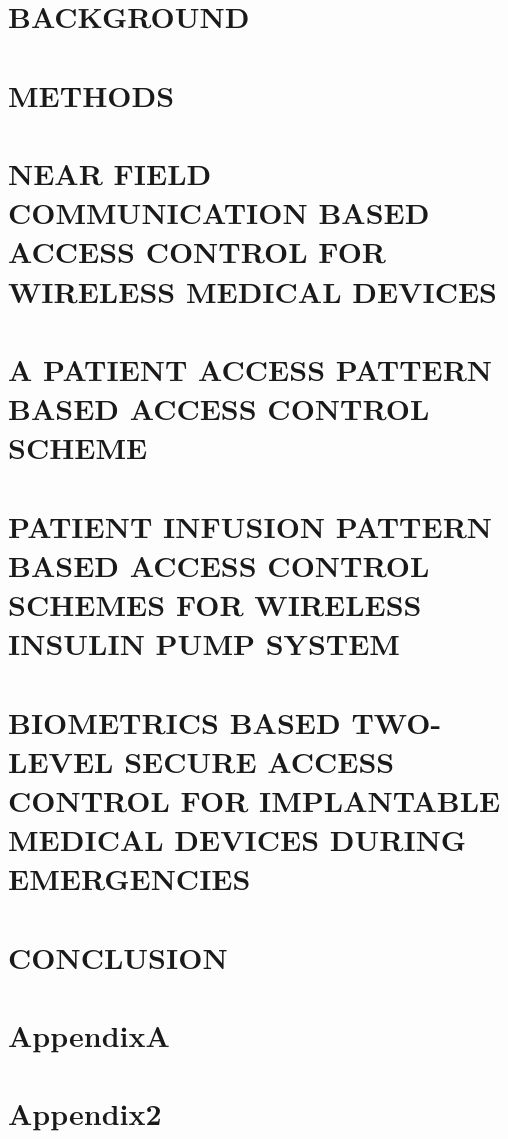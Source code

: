 \documentclass[reqno,12pt,oneside]{report} %
\begin{document}
\chapter{BACKGROUND}
 \label{chap:2}

\chapter{METHODS}
 \label{chap:3}
 

\chapter{NEAR FIELD COMMUNICATION BASED ACCESS CONTROL FOR WIRELESS MEDICAL DEVICES}
 \label{chap:4}

\chapter{A PATIENT ACCESS PATTERN BASED ACCESS CONTROL SCHEME}
 \label{chap:5}

\chapter{PATIENT INFUSION PATTERN BASED ACCESS CONTROL SCHEMES FOR WIRELESS INSULIN PUMP SYSTEM}
 \label{chap:6}

\chapter{BIOMETRICS BASED TWO-LEVEL SECURE ACCESS CONTROL FOR IMPLANTABLE MEDICAL DEVICES DURING EMERGENCIES}
 \label{chap:7}

\chapter{CONCLUSION}
 \label{chap:8}


\startbibliography
 \begin{singlespace} %
  
  
 \end{singlespace}

 \startappendices
 \chapter{AppendixA}
 \label{Appendix:A}
 
 
  \chapter{Appendix2}
 \label{Appendix:B}
 
\end{document}
